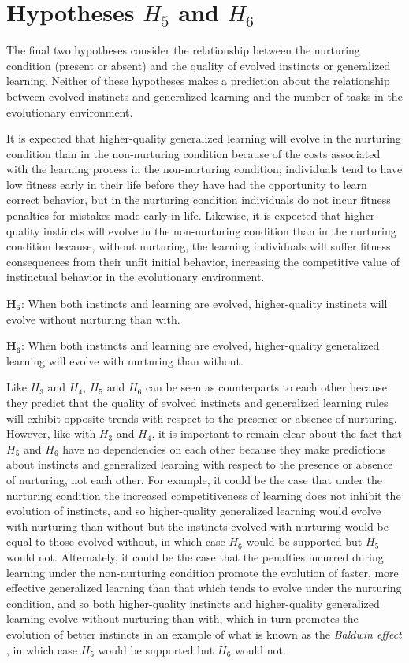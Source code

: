 \documentclass[master]{outhesis}
\begin{document}
\section{Hypotheses $H_5$ and $H_6$}

The final two hypotheses consider the relationship between the nurturing condition (present or absent) and the quality of evolved instincts or generalized learning. Neither of these hypotheses makes a prediction about the relationship between evolved instincts and generalized learning and the number of tasks in the evolutionary environment.

It is expected that higher-quality generalized learning will evolve in the nurturing condition than in the non-nurturing condition because of the costs associated with the learning process in the non-nurturing condition; individuals tend to have low fitness early in their life before they have had the opportunity to learn correct behavior, but in the nurturing condition individuals do not incur fitness penalties for mistakes made early in life.
Likewise, it is expected that higher-quality instincts will evolve in the non-nurturing condition than in the nurturing condition because, without nurturing, the learning individuals will suffer fitness consequences from their unfit initial behavior, increasing the competitive value of instinctual behavior in the evolutionary environment.

$\mathbf{H_5}$: When both instincts and learning are evolved, higher-quality instincts will evolve without nurturing than with.

$\mathbf{H_6}$: When both instincts and learning are evolved, higher-quality generalized learning will evolve with nurturing than without.

Like $H_3$ and $H_4$, $H_5$ and $H_6$ can be seen as counterparts to each other
because they predict that the quality of evolved instincts and generalized learning rules will exhibit opposite trends with respect to the presence or absence of nurturing.
However, like with $H_3$ and $H_4$, it is important to remain clear about the fact that $H_5$ and $H_6$ have no dependencies on each other because they make predictions about instincts and generalized learning with respect to the presence or absence of nurturing, not each other.
For example, it could be the case that under the nurturing condition the increased competitiveness of learning does not inhibit the evolution of instincts,
and so higher-quality generalized learning would evolve with nurturing than without but the instincts evolved with nurturing would be equal to those evolved without,
in which case $H_6$ would be supported but $H_5$ would not.
Alternately, it could be the case that the penalties incurred during learning under the non-nurturing condition promote the evolution of faster, more effective generalized learning than that which tends to evolve under the nurturing condition,
and so both higher-quality instincts and higher-quality generalized learning evolve without nurturing than with,
which in turn promotes the evolution of better instincts in an example of what is known as the \emph{Baldwin effect} \cite{Floreano:2008wv},
in which case $H_5$ would be supported but $H_6$ would not.
\end{document}
